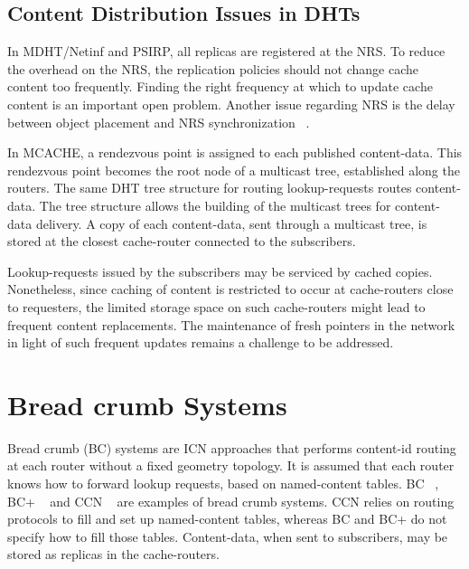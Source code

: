 \subsection{Content Distribution Issues in DHTs}


In MDHT/Netinf and PSIRP, all replicas are registered at the NRS. To reduce the overhead on the NRS, the replication policies should not
change cache content too frequently. Finding the right frequency at which to update cache content is an important open problem. 
Another issue regarding NRS is the delay between object placement and NRS synchronization ~\cite{netinf}.


In MCACHE, a rendezvous point is assigned to each published content-data.  This rendezvous point  becomes the root node of
a multicast tree, established along the routers. The same DHT tree structure for routing lookup-requests routes
content-data. The tree structure allows the building of the multicast trees for content-data delivery. 
A copy of each content-data, sent through a multicast tree, is stored at the closest
cache-router connected to the subscribers. 


Lookup-requests issued by the subscribers may be serviced by cached copies.  
Nonetheless, since 
caching of content is restricted to occur at cache-routers close to requesters,
  the limited storage space on such cache-routers might lead to frequent content replacements.
The maintenance of fresh pointers in the network in light of such frequent updates remains a challenge to be addressed.



\begin{comment}
These frequent replacements, in turn, might cause pointers to such contents, stored in other routers in the network, to rapidly stale. 
so to allow the discovery of such copies can point to copies that have already been replaced at those caches,
by newer copies, because of 
\end{comment}




\section {Bread crumb Systems}

Bread crumb (BC) systems are ICN approaches that performs content-id routing at each router without a fixed geometry topology. 
It is assumed that each router knows how to forward lookup requests, based on named-content tables. BC ~\cite{elisha2}, BC+ ~\cite{bc+}
and CCN ~\cite{ccn1} are examples of bread crumb systems. CCN relies on routing protocols to fill and set up named-content tables, 
whereas BC and BC+ do not specify how to fill those tables. Content-data, when sent to subscribers, may be stored as 
replicas in the cache-routers.  


